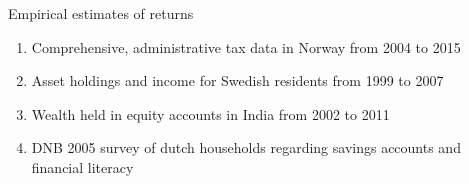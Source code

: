 \documentclass{beamer}
\begin{document}
\begin{frame}{Empirical estimates of returns}

   \small
   \begin{enumerate}
    \item Comprehensive, administrative tax data in Norway from 2004 to 2015  \parencite{aflgdmlp20}
    \item Asset holdings and income for Swedish residents from 1999 to 2007 \parencite{lblcps18}
    \item Wealth held in equity accounts in India from 2002 to 2011 \parencite{Campbell2019}
    \item DNB 2005 survey of dutch households regarding savings accounts and financial literacy \parencite{Deuflhard2018}
    \end{enumerate}
   
  
\end{frame}



    
    
    
    
    
  
\end{document}
